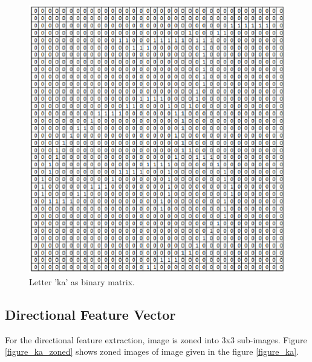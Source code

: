\begin{figure}[ht]
\begin{minipage}[b]{0.5\linewidth}
\includegraphics[scale=0.30]{figures/ka_features/ka_binary_matrix.eps}
\caption{Letter 'ka' as binary matrix.}
\label{figure_binary_matrix_of_ka}
\end{minipage}
\end{figure}

\subsection{Directional Feature Vector}
For the directional feature extraction, image is zoned into 3x3 sub-images. Figure \ref{figure_ka_zoned} shows zoned images of image given in the figure \ref{figure_ka}.

